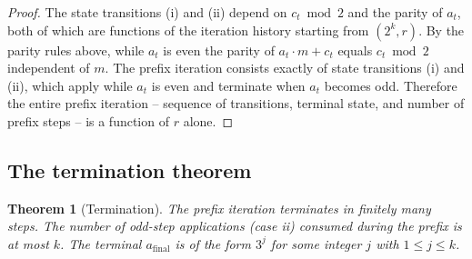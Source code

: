 \documentclass{article}
\newtheorem{theorem}{Theorem}[section]
\theoremstyle{plain}
\begin{document}
\begin{proof}
The state transitions (i) and (ii) depend on $c_t \bmod 2$ and the parity of $a_t$, both of which are functions of the iteration history starting from $(2^k, r)$. By the parity rules above, while $a_t$ is even the parity of $a_t \cdot m + c_t$ equals $c_t \bmod 2$ independent of $m$. The prefix iteration consists exactly of state transitions (i) and (ii), which apply while $a_t$ is even and terminate when $a_t$ becomes odd. Therefore the entire prefix iteration -- sequence of transitions, terminal state, and number of prefix steps -- is a function of $r$ alone.
\end{proof}

\subsection{The termination theorem}

\begin{theorem}[Termination]
\label{thm:termination}
The prefix iteration terminates in finitely many steps. The number of odd-step applications (case ii) consumed during the prefix is at most $k$. The terminal $a_{\text{final}}$ is of the form $3^j$ for some integer $j$ with $1 \leq j \leq k$.
\end{theorem}
\end{document}

